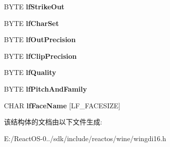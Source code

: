 \begin{DoxyCompactItemize}
B\+Y\+TE {\bfseries lf\+Strike\+Out}
\item 
\mbox{\label{struct_l_o_g_f_o_n_t16_a0b4cfa2cd566afc313ee7c5291afb27b}} 
B\+Y\+TE {\bfseries lf\+Char\+Set}
\item 
\mbox{\label{struct_l_o_g_f_o_n_t16_a7e802f2dc5d85639a2899cf938e759a0}} 
B\+Y\+TE {\bfseries lf\+Out\+Precision}
\item 
\mbox{\label{struct_l_o_g_f_o_n_t16_a1d33b6285e925a9dca994bc2d48a0be7}} 
B\+Y\+TE {\bfseries lf\+Clip\+Precision}
\item 
\mbox{\label{struct_l_o_g_f_o_n_t16_a88a02da2c6afbfea9ef58fc994e47858}} 
B\+Y\+TE {\bfseries lf\+Quality}
\item 
\mbox{\label{struct_l_o_g_f_o_n_t16_a1b646adab8258b040921f965e6c49dce}} 
B\+Y\+TE {\bfseries lf\+Pitch\+And\+Family}
\item 
\mbox{\label{struct_l_o_g_f_o_n_t16_a973cb59b8eb6f270a130552b47eb54a4}} 
C\+H\+AR {\bfseries lf\+Face\+Name} \mbox{[}L\+F\+\_\+\+F\+A\+C\+E\+S\+I\+ZE\mbox{]}
\end{DoxyCompactItemize}


该结构体的文档由以下文件生成\+:\begin{DoxyCompactItemize}
\item 
E\+:/\+React\+O\+S-\/0../sdk/include/reactos/wine/wingdi16.\+h\end{DoxyCompactItemize}
